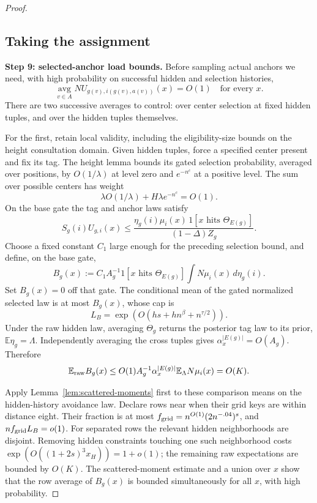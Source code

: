 \begin{proof}
\subsection{Taking the assignment}
\label{sec:taking-the-assignment-asymmetric}

\noindent\textbf{Step 9: selected-anchor load bounds.}\quad
Before sampling actual anchors we need, with high probability on successful hidden and selection histories,
\[
 \operatorname*{avg}_{v\in A}
       N U_{g(v),i(g(v),a(v))}(x)=O(1)
 \quad\text{for every }x.
\]
There are two successive averages to control: over center selection at fixed hidden tuples, and over the hidden tuples themselves.

For the first, retain local validity, including the eligibility-size bounds on the height consultation domain. Given hidden tuples, force a specified center present and fix its tag. The height lemma bounds its gated selection probability, averaged over positions, by \(O(1/\lambda)\) at level zero and \(e^{-n^c}\) at a positive level. The sum over possible centers has weight
\[
 \lambda O(1/\lambda)+H\lambda e^{-n^c}=O(1).
\]
On the base gate the tag and anchor laws satisfy
\[
 S_g(i)U_{g,i}(x)
 \le
 \frac{\eta_g(i)\mu_i(x)\,
       1[x\text{ hits }\Theta_{E(g)}]}
      {(1-\Delta)Z_g}.
\]
Choose a fixed constant \(C_1\) large enough for the preceding selection bound, and define, on the base gate,
\[
 B_g(x):=
 C_1A_g^{-1}1[x\text{ hits }\Theta_{E(g)}]
                    \int N\mu_i(x)\,d\eta_g(i).
\]
Set \(B_g(x)=0\) off that gate. The conditional mean of the gated normalized selected law is at most \(B_g(x)\), whose cap is
\[
 L_B=\exp(O(hs+hn^\beta+n^{\tau/2})).
\]
Under the raw hidden law, averaging \(\Theta_g\) returns the posterior tag law to its prior, \(\mathbb E\eta_g=\Lambda\). Independently averaging the cross tuples gives
\(\alpha_x^{|E(g)|}=O(A_g)\). Therefore
\[
 \mathbb E_{\rm raw}B_g(x)
 \le O(1)A_g^{-1}\alpha_x^{|E(g)|}
                    \mathbb E_\Lambda N\mu_i(x)
 =O(K).
\]

Apply Lemma~\ref{lem:scattered-moments} first to these comparison means on the hidden-history avoidance law. Declare rows near when their grid keys are within distance eight. Their fraction is at most
\(f_{\rm grid}=n^{O(1)}(2n^{-.04})^s\), and
\(nf_{\rm grid}L_B=o(1)\).
For separated rows the relevant hidden neighborhoods are disjoint. Removing hidden constraints touching one such neighborhood costs
\(\exp(O((1+2s)^3x_H))=1+o(1)\);
the remaining raw expectations are bounded by \(O(K)\). The scattered-moment estimate and a union over \(x\) show that the row average of \(B_g(x)\) is bounded simultaneously for all \(x\), with high probability.


\end{proof}
